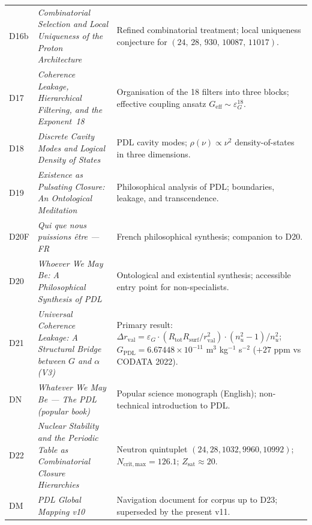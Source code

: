 \documentclass[11pt,a4paper]{article}
\theoremstyle{plain}
\theoremstyle{definition}
\theoremstyle{remark}
\newcommand{\quintuplet}{(24,\,28,\,930,\,10087,\,11017)}
\newcommand{\Geff}{G_{\mathrm{eff}}}
\newcommand{\GPDL}{G_{\mathrm{PDL}}}
\newcommand{\epsG}{\varepsilon_G}
\newcommand{\rval}{r_{\mathrm{val}}}
\begin{document}
\begin{longtable}{@{}L{1.3cm}L{3.8cm}L{8.0cm}@{}}
D16b & \textit{Combinatorial Selection and Local Uniqueness of the Proton Architecture}~\citep{D16b} & Refined combinatorial treatment; local uniqueness conjecture for $\quintuplet$. \\[0.3em]

D17 & \textit{Coherence Leakage, Hierarchical Filtering, and the Exponent~18}~\citep{D17} & Organisation of the 18 filters into three blocks; effective coupling ansatz $\Geff\sim\epsG^{18}$. \\[0.3em]

D18 & \textit{Discrete Cavity Modes and Logical Density of States}~\citep{D18} & PDL cavity modes; $\rho(\nu)\propto\nu^2$ density-of-states in three dimensions. \\[0.3em]

D19 & \textit{Existence as Pulsating Closure: An Ontological Meditation}~\citep{D19} & Philosophical analysis of PDL; boundaries, leakage, and transcendence. \\[0.3em]

D20F & \textit{Qui que nous puissions \^etre — FR}~\citep{D20F} & French philosophical synthesis; companion to D20. \\[0.3em]

D20 & \textit{Whoever We May Be: A Philosophical Synthesis of PDL}~\citep{D20} & Ontological and existential synthesis; accessible entry point for non-specialists. \\[0.3em]

D21 & \textit{Universal Coherence Leakage: A Structural Bridge between $G$ and $\alpha$ (V3)}~\citep{D21} & \textcolor{proofblue}{Primary result}: $\Delta\rval = \epsG\cdot(R_{\mathrm{tot}}R_{\mathrm{surf}}/\rval^2)\cdot(n_u^2-1)/n_u^2$; $\GPDL = 6.67448\times 10^{-11}$ m$^3$ kg$^{-1}$ s$^{-2}$ ($+27$ ppm vs CODATA 2022). \\[0.3em]

DN & \textit{Whatever We May Be — The PDL (popular book)}~\citep{DN} & Popular science monograph (English); non-technical introduction to PDL. \\[0.3em]

D22 & \textit{Nuclear Stability and the Periodic Table as Combinatorial Closure Hierarchies}~\citep{D22} & Neutron quintuplet $(24,28,1032,9960,10992)$; $N_{\mathrm{crit,max}}=126.1$; $Z_{\mathrm{sat}}\approx 20$. \\[0.3em]

DM & \textit{PDL Global Mapping v10}~\citep{D_Map_v10} & Navigation document for corpus up to D23; superseded by the present v11. \\[0.3em]


\end{longtable}
\end{document}
